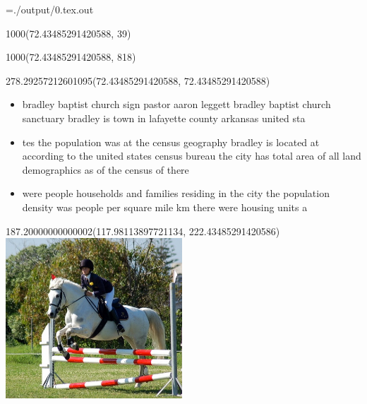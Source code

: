 \documentclass[10pt]{article}
\begin{document}
    
    \newwrite\writeFH
    \immediate\openout\writeFH=./output/0.tex.out
    \newlength{ \myreusablelength }
    
    \begin{textblock}{1000}(72.43485291420588, 39)
    \end{textblock}
    
    \begin{textblock}{1000}(72.43485291420588, 818)
    \end{textblock}
    
    \begin{textblock}{278.29257212601095}(72.43485291420588, 72.43485291420588)
        \begin{itemize}
            \itemsep0em
            \item {\color{cyan} bradley baptist church sign pastor aaron leggett bradley baptist church sanctuary bradley is town in lafayette county arkansas united sta} \item {\color{cyan} tes the population was at the census geography bradley is located at according to the united states census bureau the city has total area of all land demographics as of the census of there} \item {\color{cyan}  were people households and families residing in the city the population density was people per square mile km there were housing units a} 
        \end{itemize}
    \end{textblock}
    
    \begin{textblock}{187.20000000000002}(117.98113897721134, 222.43485291420586)
    \noindent
    \includegraphics[width=187.20000000000002pt,height=170.43pt]{data/Images/2007_000783.jpg}
    \end{textblock}
    
\end{document}
